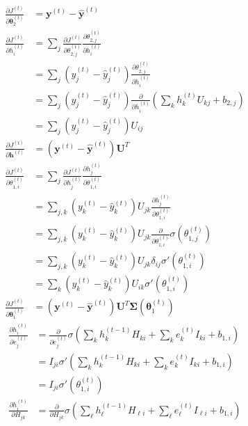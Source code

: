 \documentclass{article}
\begin{document}
\begin{itemize}
    \begin{align*}
        \frac{\partial J^{(t)}}{\partial \boldsymbol{\theta}_2^{(t)}} &= \mathbf{y}^{(t)} - \hat{\mathbf{y}}^{(t)} \\
        \frac{\partial J^{(t)}}{\partial h^{(t)}_i} &= \sum_j \frac{\partial J^{(t)}}{\partial \theta_{2,j}^{(t)}}\frac{\partial \theta_{2, j}^{(t)}}{\partial h^{(t)}_i}\\
        &= \sum_j (y^{(t)}_j - \hat{y}^{(t)}_j) \frac{\partial \theta_{2, j}^{(t)}}{\partial h^{(t)}_i} \\
        &= \sum_j (y^{(t)}_j - \hat{y}^{(t)}_j) \frac{\partial}{\partial h^{(t)}_i} (\sum_k h^{(t)}_k U_{kj} + b_{2, j}) \\
        &= \sum_j (y^{(t)}_j - \hat{y}^{(t)}_j) U_{ij} \\
        \frac{\partial J^{(t)}}{\partial \mathbf{h}^{(t)}} &= (\mathbf{y}^{(t)} - \hat{\mathbf{y}}^{(t)}) \mathbf{U}^T \\
        \frac{\partial J^{(t)}}{\partial \theta_{1, i}^{(t)}} &= \sum_j \frac{\partial J^{(t)}}{\partial h^{(t)}_j} \frac{\partial h^{(t)}_j}{\partial \theta_{1, i}^{(t)}} \\
        &= \sum_{j,k} (y^{(t)}_k - \hat{y}^{(t)}_k) U_{jk} \frac{\partial h^{(t)}_j}{\partial \theta_{1, i}^{(t)}} \\
        &= \sum_{j,k} (y^{(t)}_k - \hat{y}^{(t)}_k) U_{jk} \frac{\partial}{\partial \theta_{1, i}^{(t)}} \sigma(\theta_{1, j}^{(t)}) \\
        &= \sum_{j,k} (y^{(t)}_k - \hat{y}^{(t)}_k) U_{jk} \delta_{ij} \sigma'(\theta_{1, i}^{(t)}) \\
        &= \sum_{k} (y^{(t)}_k - \hat{y}^{(t)}_k) U_{ik} \sigma'(\theta_{1, i}^{(t)}) \\
        \frac{\partial J^{(t)}}{\partial \boldsymbol{\theta}_1^{(t)}} &= (\mathbf{y}^{(t)} - \hat{\mathbf{y}}^{(t)}) \mathbf{U}^T \boldsymbol{\Sigma}(\boldsymbol{\theta}_1^{(t)})
    \end{align*}
    \begin{align*}
        \frac{\partial h^{(t)}_i}{\partial e^{(t)}_j} &= \frac{\partial}{\partial e^{(t)}_j} \sigma(\sum_k h^{(t-1)}_k H_{ki} + \sum_k e^{(t)}_k I_{ki} + b_{1, i}) \\
        &= I_{ji} \sigma'(\sum_kh^{(t-1)}_k H_{ki} + \sum_k e^{(t)}_k I_{ki} + b_{1, i}) \\
        &= I_{ji} \sigma'(\theta^{(t)}_{1, i}) \\
        \frac{\partial h^{(t)}_i}{\partial H_{jk}} &= \frac{\partial}{\partial H_{jk}} \sigma(\sum_\ell h^{(t-1)}_\ell H_{\ell i} + \sum_\ell e^{(t)}_\ell I_{\ell i} + b_{1, i}) \\

\end{align*}
\end{itemize}
\end{document}
